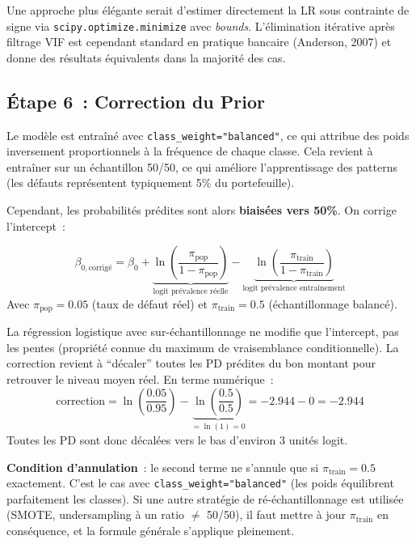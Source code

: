 \documentclass[12pt,a4paper]{article}
\begin{document}
\begin{warningbox}
Une approche plus \'el\'egante serait d'estimer directement la LR sous contrainte de signe via \texttt{scipy.optimize.minimize} avec \textit{bounds}. L'\'elimination it\'erative apr\`es filtrage VIF est cependant standard en pratique bancaire (Anderson, 2007) et donne des r\'esultats \'equivalents dans la majorit\'e des cas.
\end{warningbox}

\subsection{\'Etape 6~: Correction du Prior}

Le mod\`ele est entra\^in\'e avec \texttt{class\_weight="balanced"}, ce qui attribue des poids inversement proportionnels \`a la fr\'equence de chaque classe. Cela revient \`a entra\^iner sur un \'echantillon 50/50, ce qui am\'eliore l'apprentissage des patterns (les d\'efauts repr\'esentent typiquement 5\% du portefeuille).

Cependant, les probabilit\'es pr\'edites sont alors \textbf{biais\'ees vers 50\%}. On corrige l'intercept~:

\begin{formulebox}
\begin{equation}
    \beta_{0,\text{corrig\'e}} = \beta_0 + \underbrace{\ln\left(\frac{\pi_{\text{pop}}}{1 - \pi_{\text{pop}}}\right)}_{\text{logit pr\'evalence r\'eelle}} - \underbrace{\ln\left(\frac{\pi_{\text{train}}}{1 - \pi_{\text{train}}}\right)}_{\text{logit pr\'evalence entra\^inement}}
    \label{eq:prior}
\end{equation}
Avec $\pi_{\text{pop}} = 0.05$ (taux de d\'efaut r\'eel) et $\pi_{\text{train}} = 0.5$ (\'echantillonnage balanc\'e).
\end{formulebox}

\begin{interpretbox}
La r\'egression logistique avec sur-\'echantillonnage ne modifie que l'intercept, pas les pentes (propri\'et\'e connue du maximum de vraisemblance conditionnelle). La correction revient \`a ``d\'ecaler'' toutes les PD pr\'edites du bon montant pour retrouver le niveau moyen r\'eel. En terme num\'erique~:
$$\text{correction} = \ln\left(\frac{0.05}{0.95}\right) - \underbrace{\ln\left(\frac{0.5}{0.5}\right)}_{= \ln(1) = 0} = -2.944 - 0 = -2.944$$
Toutes les PD sont donc d\'ecal\'ees vers le bas d'environ 3 unit\'es logit.

\textbf{Condition d'annulation}~: le second terme ne s'annule que si $\pi_{\text{train}} = 0.5$ exactement. C'est le cas avec \texttt{class\_weight="balanced"} (les poids \'equilibrent parfaitement les classes). Si une autre strat\'egie de r\'e-\'echantillonnage est utilis\'ee (SMOTE, undersampling \`a un ratio $\neq$ 50/50), il faut mettre \`a jour $\pi_{\text{train}}$ en cons\'equence, et la formule g\'en\'erale s'applique pleinement.
\end{interpretbox}
\end{document}
